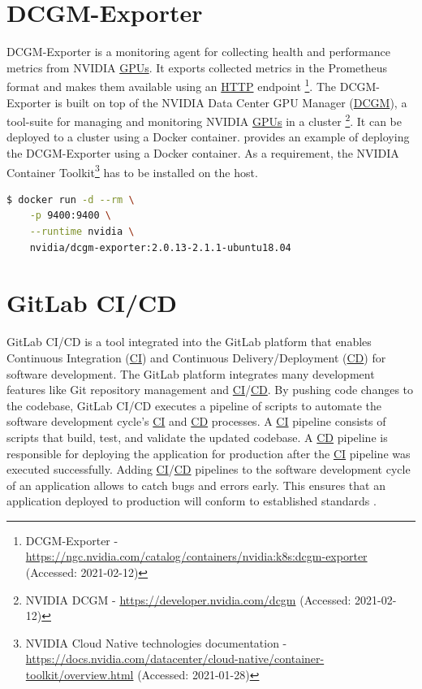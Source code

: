 \section{DCGM-Exporter}
DCGM-Exporter is a monitoring agent for collecting health and performance metrics from NVIDIA \hyperlink{abbr:gpu}{GPUs}. It exports collected metrics in the Prometheus format and makes them available using an \hyperlink{abbr:http}{HTTP} endpoint \footnote{DCGM-Exporter - \url{https://ngc.nvidia.com/catalog/containers/nvidia:k8s:dcgm-exporter} (Accessed: 2021-02-12)}.
The DCGM-Exporter is built on top of the NVIDIA Data Center GPU Manager (\hyperlink{abbr:dcgm}{DCGM}), a tool-suite for managing and monitoring NVIDIA \hyperlink{abbr:gpu}{GPUs} in a cluster \footnote{NVIDIA DCGM - \url{https://developer.nvidia.com/dcgm} (Accessed: 2021-02-12)}.
%
It can be deployed to a cluster using a Docker container.  provides an example of deploying the DCGM-Exporter using a Docker container. As a requirement, the NVIDIA Container Toolkit\footnote{NVIDIA Cloud Native technologies documentation - \url{https://docs.nvidia.com/datacenter/cloud-native/container-toolkit/overview.html} (Accessed: 2021-01-28)} has to be installed on the host.
\begin{lstlisting}[label=lst:04_dcgm_deploy, caption=DCGM-Exporter deployment using a Docker container, language=bash, numbers=none]
$ docker run -d --rm \
    -p 9400:9400 \
    --runtime nvidia \
    nvidia/dcgm-exporter:2.0.13-2.1.1-ubuntu18.04
\end{lstlisting}


\section{GitLab CI/CD}
\label{sec:04_background_gitlab}
GitLab CI/CD is a tool integrated into the GitLab platform that enables Continuous Integration (\hyperlink{abbr:ci}{CI}) and Continuous Delivery/Deployment (\hyperlink{abbr:cd}{CD}) for software development.
The GitLab platform integrates many development features like Git repository management and \hyperlink{abbr:ci}{CI}/\hyperlink{abbr:cd}{CD}.
By pushing code changes to the codebase, GitLab CI/CD executes a pipeline of scripts to automate the software development cycle's \hyperlink{abbr:ci}{CI} and \hyperlink{abbr:cd}{CD} processes.
A \hyperlink{abbr:ci}{CI} pipeline consists of scripts that build, test, and validate the updated codebase.
A \hyperlink{abbr:cd}{CD} pipeline is responsible for deploying the application for production after the \hyperlink{abbr:ci}{CI} pipeline was executed successfully.
Adding \hyperlink{abbr:ci}{CI}/\hyperlink{abbr:cd}{CD} pipelines to the software development cycle of an application allows to catch bugs and errors early. This ensures that an application deployed to production will conform to established standards \cite{Gitlab2020Docs}.

